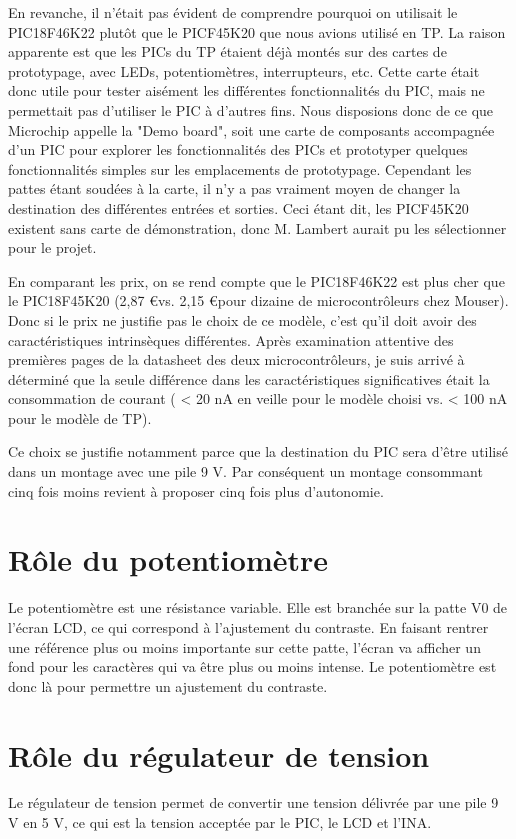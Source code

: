 \documentclass[a4paper,11pt,titlepage]{article}
\begin{document}
En revanche, il n'était pas évident de comprendre pourquoi on utilisait le PIC18F46K22 plutôt que le PICF45K20 que nous avions utilisé en TP. La raison apparente est que les PICs du TP étaient déjà montés sur des cartes de prototypage, avec LEDs, potentiomètres, interrupteurs, etc. Cette carte était donc utile pour tester aisément les différentes fonctionnalités du PIC, mais ne permettait pas d'utiliser le PIC à d'autres fins. Nous disposions donc de ce que Microchip appelle la "Demo board", soit une carte de composants accompagnée d'un PIC pour explorer les fonctionnalités des PICs et prototyper quelques fonctionnalités simples sur les emplacements de prototypage. Cependant les pattes étant soudées à la carte, il n'y a pas vraiment moyen de changer la destination des différentes entrées et sorties.
Ceci étant dit, les PICF45K20 existent sans carte de démonstration, donc M. Lambert aurait pu les sélectionner pour le projet.

En comparant les prix, on se rend compte que le PIC18F46K22 est plus cher que le PIC18F45K20 (2,87 \euro  vs. 2,15 \euro  pour dizaine de microcontrôleurs chez Mouser). Donc si le prix ne justifie pas le choix de ce modèle, c'est qu'il doit avoir des caractéristiques intrinsèques différentes. Après examination attentive des premières pages de la datasheet des deux microcontrôleurs, je suis arrivé à déterminé que la seule différence dans les caractéristiques significatives était la consommation de courant ( < 20 nA en veille pour le modèle choisi vs. < 100 nA pour le modèle de TP).

Ce choix se justifie notamment parce que la destination du PIC sera d'être utilisé dans un montage avec une pile 9 V. Par conséquent un montage consommant cinq fois moins revient à proposer cinq fois plus d'autonomie. 

\section{Rôle du potentiomètre}
Le potentiomètre est une résistance variable. Elle est branchée sur la patte V0 de l'écran LCD, ce qui correspond à l'ajustement du contraste. En faisant rentrer une référence plus ou moins importante sur cette patte, l'écran va afficher un fond pour les caractères qui va être plus ou moins intense. Le potentiomètre est donc là pour permettre un ajustement du contraste.


\section{Rôle du régulateur de tension}
Le régulateur de tension permet de convertir une tension délivrée par une pile 9 V en 5 V, ce qui est la tension acceptée par le PIC, le LCD et l'INA.
\end{document}
